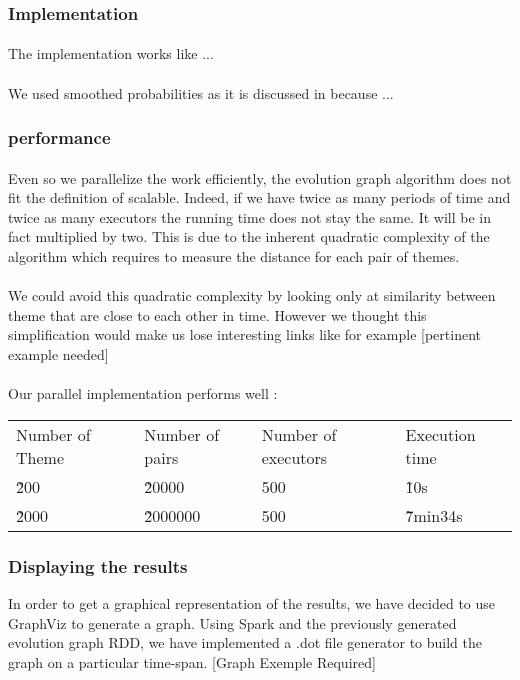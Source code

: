 \subsubsection{Implementation}
\label{sec:EvoGraImp}
\paragraph{}
The implementation works like ...

\paragraph{}
We used smoothed probabilities as it is discussed in \cite{de2010grammatical} because ... 

\subsubsection{performance}
\paragraph{}
Even so we parallelize the work efficiently, the evolution graph algorithm does not fit the definition of scalable. Indeed, if we have twice as many periods of time and twice as many executors the running time does not stay the same. It will be in fact multiplied by two. This is due to the inherent quadratic complexity of the algorithm which requires to measure the distance for each pair of themes.

\paragraph{}
We could avoid this quadratic complexity by looking only at similarity between theme that are close to each other in time. However we thought this simplification would make us lose interesting links like for example [pertinent example needed]

\paragraph{}
Our parallel implementation performs well :
\newline
\begin{tabular}{llll}
Number of Theme & Number of pairs & Number of executors & Execution time \\
\~ 200 & \~ 20000 & 500 & \~ 10s \\
\~ 2000 & \~ 2000000 & 500 & \~ 7min34s \\
\end{tabular}


\subsubsection{Displaying the results}
In order to get a graphical representation of the results, we have decided to use GraphViz to generate a graph. Using Spark and the previously generated evolution graph RDD, we have implemented a .dot file generator to build the graph on a particular time-span.
[Graph Exemple Required]
